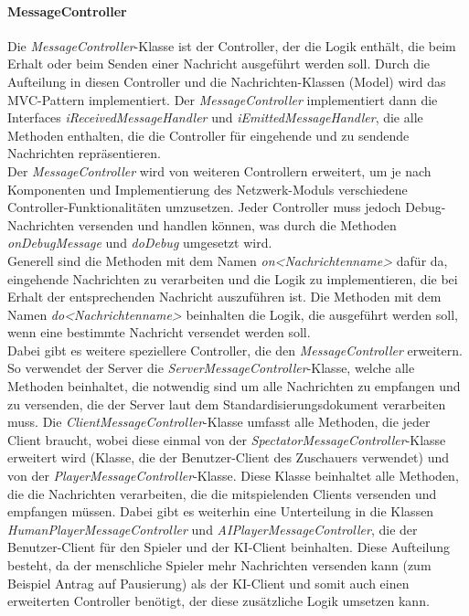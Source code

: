 \documentclass[12pt]{article}
\newcommand{\class}[1]{\textit{#1}-Klasse}
\newcounter{fa}
\begin{document}
\paragraph{MessageController}
Die \class{MessageController} ist der Controller, der die Logik enthält, die beim Erhalt oder beim Senden einer Nachricht ausgeführt werden soll. Durch die Aufteilung in diesen Controller und die Nachrichten-Klassen (Model) wird das MVC-Pattern implementiert. Der \textit{MessageController} implementiert dann die Interfaces \textit{iReceivedMessageHandler} und \textit{iEmittedMessageHandler}, die alle Methoden enthalten, die die Controller für eingehende und zu sendende Nachrichten repräsentieren. \\ Der \textit{MessageController} wird von weiteren Controllern erweitert, um je nach Komponenten und Implementierung des Netzwerk-Moduls verschiedene Controller-Funktionalitäten umzusetzen. Jeder Controller muss jedoch Debug-Nachrichten versenden und handlen können, was durch die Methoden \textit{onDebugMessage} und \textit{doDebug} umgesetzt wird.
\\ Generell sind die Methoden mit dem Namen \textit{on<Nachrichtenname>} dafür da, eingehende Nachrichten zu verarbeiten und die Logik zu implementieren, die bei Erhalt der entsprechenden Nachricht auszuführen ist. Die Methoden mit dem Namen \textit{do<Nachrichtenname>} beinhalten die Logik, die ausgeführt werden soll, wenn eine bestimmte Nachricht versendet werden soll. \\ Dabei gibt es weitere speziellere Controller, die den \textit{MessageController} erweitern. So verwendet der Server die \class{ServerMessageController}, welche alle Methoden beinhaltet, die notwendig sind um alle Nachrichten zu empfangen und zu versenden, die der Server laut dem Standardisierungsdokument verarbeiten muss. Die \class{ClientMessageController} umfasst alle Methoden, die jeder Client braucht, wobei diese einmal von der \class{SpectatorMessageController} erweitert wird (Klasse, die der Benutzer-Client des Zuschauers verwendet) und von der \class{PlayerMessageController}. Diese Klasse beinhaltet alle Methoden, die die Nachrichten verarbeiten, die die mitspielenden Clients versenden und empfangen müssen. Dabei gibt es weiterhin eine Unterteilung in die Klassen \textit{HumanPlayerMessageController} und \textit{AIPlayerMessageController}, die der Benutzer-Client für den Spieler und der KI-Client beinhalten. Diese Aufteilung besteht, da der menschliche Spieler mehr Nachrichten versenden kann (zum Beispiel Antrag auf Pausierung) als der KI-Client und somit auch einen erweiterten Controller benötigt, der diese zusätzliche Logik umsetzen kann. 
\end{document}
